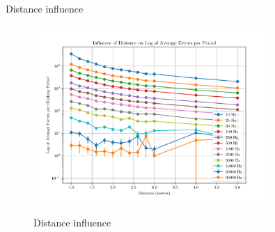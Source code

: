 \documentclass{beamer}
\begin{document}
\begin{frame}{Distance influence}

\begin{figure}[H]
    \centering
    \includegraphics[width=0.8\textwidth]{../fig/semestral/distlog.pdf}
    \label{fig:dist_influence}
    \caption{Distance influence}
\end{figure}

\end{frame}




\end{document}
